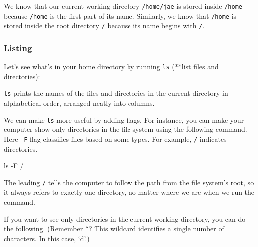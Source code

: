 \documentclass[
]{book}
\newenvironment{Shaded}{\begin{snugshade}}{\end{snugshade}}
\newcommand{\AttributeTok}[1]{\textcolor[rgb]{0.77,0.63,0.00}{#1}}
\newcommand{\ExtensionTok}[1]{#1}
\newcommand{\FunctionTok}[1]{\textcolor[rgb]{0.00,0.00,0.00}{#1}}
\newcommand{\NormalTok}[1]{#1}
\begin{document}
We know that our current working directory \texttt{/home/jae} is stored inside \texttt{/home} because \texttt{/home} is the first part of its name. Similarly, we know that \texttt{/home} is stored inside the root directory \texttt{/} because its name begins with \texttt{/}.

\hypertarget{listing}{%
\subsubsection{Listing}\label{listing}}

Let's see what's in your home directory by running \texttt{ls} (**list files and directories):

\begin{Shaded}
\end{Shaded}

\texttt{ls} prints the names of the files and directories in the current directory in alphabetical order, arranged neatly into columns.

We can make \texttt{ls} more useful by adding flags. For instance, you can make your computer show only directories in the file system using the following command. Here \texttt{-F} flag classifies files based on some types. For example, \texttt{/} indicates directories.

\begin{Shaded}
\begin{Highlighting}[]
\FunctionTok{ls} \AttributeTok{{-}F}\NormalTok{ /}
\end{Highlighting}
\end{Shaded}

The leading \texttt{/} tells the computer to follow the path from the file system's root, so it always refers to exactly one directory, no matter where we are when we run the command.

If you want to see only directories in the current working directory, you can do the following. (Remember \texttt{\^{}}? This wildcard identifies a single number of characters. In this case, `d'.)
\end{document}
